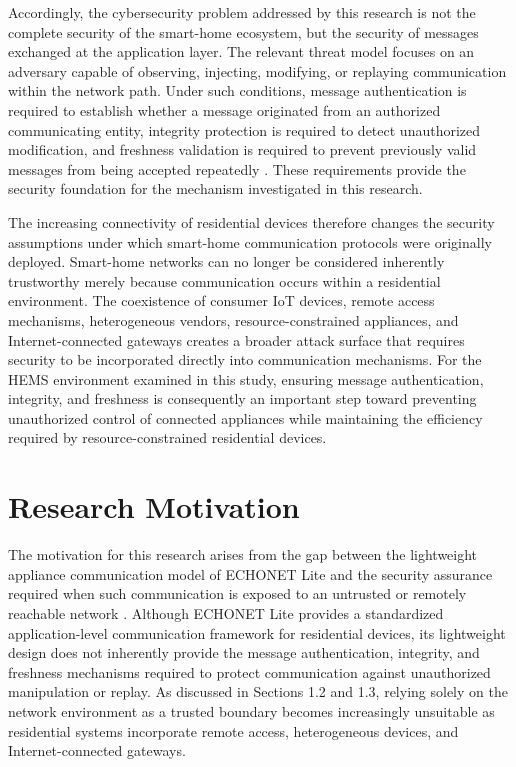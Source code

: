 Accordingly, the cybersecurity problem addressed by this research is not the complete security of the smart-home ecosystem, but the security of messages exchanged at the application layer. The relevant threat model focuses on an adversary capable of observing, injecting, modifying, or replaying communication within the network path. Under such conditions, message authentication is required to establish whether a message originated from an authorized communicating entity, integrity protection is required to detect unauthorized modification, and freshness validation is required to prevent previously valid messages from being accepted repeatedly \citep{AlJanah2021,heartfieldTaxonomyCyberphysicalThreats2018}. These requirements provide the security foundation for the mechanism investigated in this research.

The increasing connectivity of residential devices therefore changes the security assumptions under which smart-home communication protocols were originally deployed. Smart-home networks can no longer be considered inherently trustworthy merely because communication occurs within a residential environment. The coexistence of consumer IoT devices, remote access mechanisms, heterogeneous vendors, resource-constrained appliances, and Internet-connected gateways creates a broader attack surface that requires security to be incorporated directly into communication mechanisms. For the HEMS environment examined in this study, ensuring message authentication, integrity, and freshness is consequently an important step toward preventing unauthorized control of connected appliances while maintaining the efficiency required by resource-constrained residential devices.


\section{Research Motivation}

The motivation for this research arises from the gap between the lightweight appliance communication model of ECHONET Lite and the security assurance required when such communication is exposed to an untrusted or remotely reachable network \citep{ECHONETPart2,eissaDevelopingIncentiveDemand2019,murakamiApplicationECHONETLite2016}. Although ECHONET Lite provides a standardized application-level communication framework for residential devices, its lightweight design does not inherently provide the message authentication, integrity, and freshness mechanisms required to protect communication against unauthorized manipulation or replay. As discussed in Sections 1.2 and 1.3, relying solely on the network environment as a trusted boundary becomes increasingly unsuitable as residential systems incorporate remote access, heterogeneous devices, and Internet-connected gateways.

